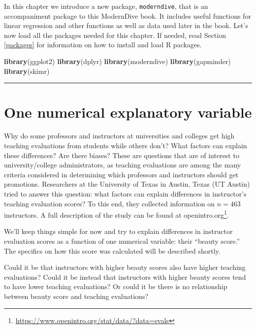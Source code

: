 \documentclass[12pt, krantz2,]{krantz}
\makeatletter
\newenvironment{Shaded}{\begin{snugshade}}{\end{snugshade}}
\newcommand{\KeywordTok}[1]{\textcolor[rgb]{0.27,0.27,0.27}{\textbf{#1}}}
\newcommand{\NormalTok}[1]{#1}
\renewcommand{\href}[2]{#2\footnote{\url{#1}}}
\newenvironment{kframe}{%
\medskip{}
\setlength{\fboxsep}{.8em}
 \def\at@end@of@kframe{}%
 \ifinner\ifhmode%
  \def\at@end@of@kframe{\end{minipage}}%
  \begin{minipage}{\columnwidth}%
 \fi\fi%
 \def\FrameCommand##1{\hskip\@totalleftmargin \hskip-\fboxsep
 \colorbox{shadecolor}{##1}\hskip-\fboxsep
     \hskip-\linewidth \hskip-\@totalleftmargin \hskip\columnwidth}%
 \MakeFramed {\advance\hsize-\width
   \@totalleftmargin\z@ \linewidth\hsize
   \@setminipage}}%
 {\par\unskip\endMakeFramed%
 \at@end@of@kframe}
\renewenvironment{Shaded}{\begin{kframe}}{\end{kframe}}
\makeatother
\begin{document}
In this chapter we introduce a new package, \texttt{moderndive}, that is an accompaniment package to this ModernDive book. It includes useful functions for linear regression and other functions as well as data used later in the book. Let's now load all the packages needed for this chapter. If needed, read Section \ref{packages} for information on how to install and load R packages.

\begin{Shaded}
\begin{Highlighting}[]
\KeywordTok{library}\NormalTok{(ggplot2)}
\KeywordTok{library}\NormalTok{(dplyr)}
\KeywordTok{library}\NormalTok{(moderndive)}
\KeywordTok{library}\NormalTok{(gapminder)}
\KeywordTok{library}\NormalTok{(skimr)}
\end{Highlighting}
\end{Shaded}

\begin{center}\rule{0.5\linewidth}{\linethickness}\end{center}

\hypertarget{model1}{%
\section{One numerical explanatory variable}\label{model1}}

Why do some professors and instructors at universities and colleges get high teaching evaluations from students while others don't? What factors can explain these differences? Are there biases? These are questions that are of interest to university/college administrators, as teaching evaluations are among the many criteria considered in determining which professors and instructors should get promotions. Researchers at the University of Texas in Austin, Texas (UT Austin) tried to answer this question: what factors can explain differences in instructor's teaching evaluation scores? To this end, they collected information on \(n = 463\) instructors. A full description of the study can be found at \href{https://www.openintro.org/stat/data/?data=evals}{openintro.org}.

We'll keep things simple for now and try to explain differences in instructor evaluation scores as a function of one numerical variable: their ``beauty score.'' The specifics on how this score was calculated will be described shortly.

Could it be that instructors with higher beauty scores also have higher teaching evaluations? Could it be instead that instructors with higher beauty scores tend to have lower teaching evaluations? Or could it be there is no relationship between beauty score and teaching evaluations?
\end{document}
